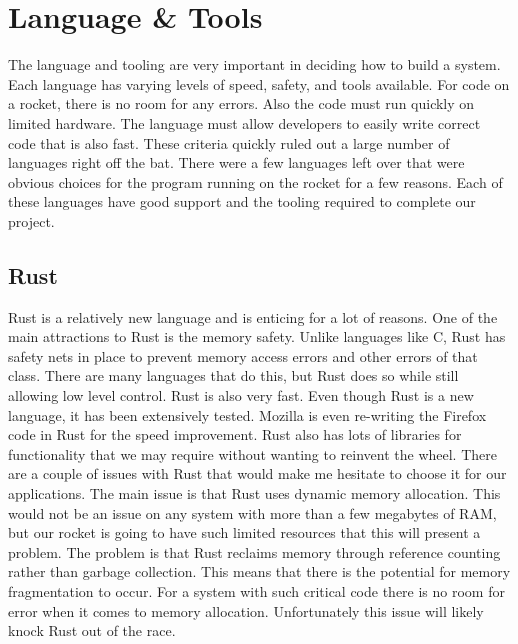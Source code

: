 \documentclass[onecolumn, draftclsnofoot,10pt, compsoc]{IEEEtran}
\begin{document}
\section{Language \& Tools}
The language and tooling are very important in deciding how to build a system.
Each language has varying levels of speed, safety, and tools available.
For code on a rocket, there is no room for any errors.
Also the code must run quickly on limited hardware.
The language must allow developers to easily write correct code that is also fast.
These criteria quickly ruled out a large number of languages right off the bat.
There were a few languages left over that were obvious choices for the program running on the rocket for a few reasons.
Each of these languages have good support and the tooling required to complete our project.

\subsection{Rust}
Rust is a relatively new language and is enticing for a lot of reasons.
One of the main attractions to Rust is the memory safety.
Unlike languages like C, Rust has safety nets in place to prevent memory access errors and other errors of that class.
There are many languages that do this, but Rust does so while still allowing low level control.
Rust is also very fast.
Even though Rust is a new language, it has been extensively tested.
Mozilla is even re-writing the Firefox code in Rust for the speed improvement.
Rust also has lots of libraries for functionality that we may require without wanting to reinvent the wheel.
There are a couple of issues with Rust that would make me hesitate to choose it for our applications.
The main issue is that Rust uses dynamic memory allocation.
This would not be an issue on any system with more than a few megabytes of RAM, but our rocket is going to have such limited resources that this will present a problem.
The problem is that Rust reclaims memory through reference counting rather than garbage collection.
This means that there is the potential for memory fragmentation to occur.
For a system with such critical code there is no room for error when it comes to memory allocation.
Unfortunately this issue will likely knock Rust out of the race.
\end{document}
